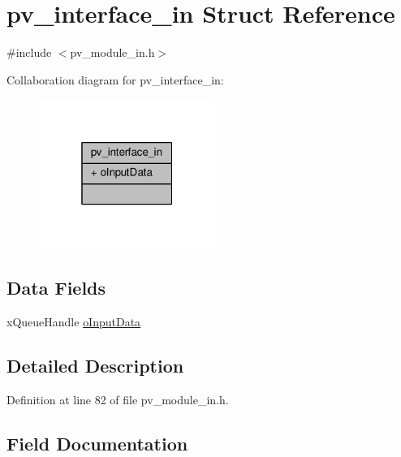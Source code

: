 \hypertarget{structpv__interface__in}{}\section{pv\+\_\+interface\+\_\+in Struct Reference}
\label{structpv__interface__in}


{\ttfamily \#include $<$pv\+\_\+module\+\_\+in.\+h$>$}



Collaboration diagram for pv\+\_\+interface\+\_\+in\+:\nopagebreak
\begin{figure}[H]
\begin{center}
\leavevmode
\includegraphics[width=163pt]{structpv__interface__in__coll__graph}
\end{center}
\end{figure}
\subsection*{Data Fields}
\begin{DoxyCompactItemize}
\item 
x\+Queue\+Handle \hyperlink{structpv__interface__in_a1b28b7bd6ca96936bf91240eea51d3b9}{o\+Input\+Data}
\end{DoxyCompactItemize}


\subsection{Detailed Description}


Definition at line 82 of file pv\+\_\+module\+\_\+in.\+h.



\subsection{Field Documentation}

